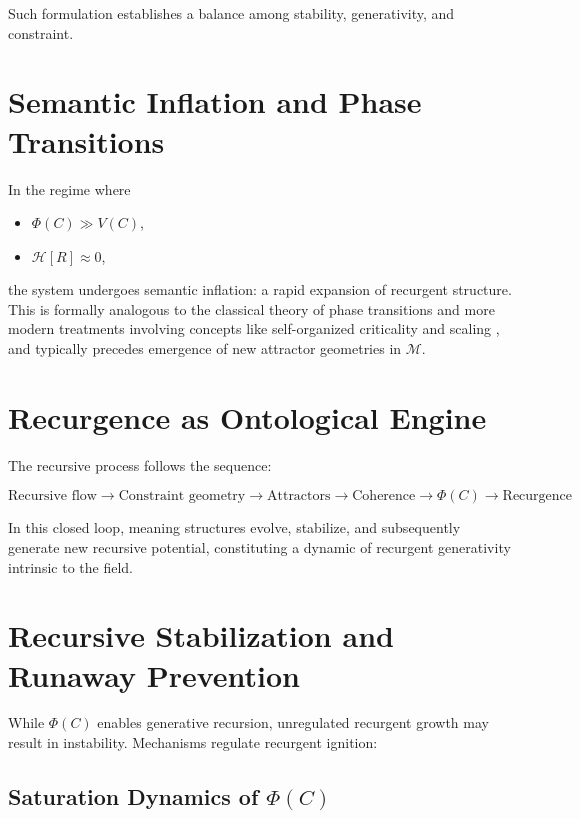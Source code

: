 Such formulation establishes a balance among stability, generativity, and constraint.

\section{Semantic Inflation and Phase Transitions}

In the regime where

\begin{itemize}
    \item \(\Phi(C) \gg V(C)\),
    \item \(\mathcal{H}[R] \approx 0\),
\end{itemize}

the system undergoes semantic inflation: a rapid expansion of recurgent structure. This is formally analogous to the classical theory of phase transitions \autocite{Landau1937} and more modern treatments involving concepts like self-organized criticality and scaling \autocite{BakTangWiesenfeld1987, Cardy1996, Goldenfeld1992}, and typically precedes emergence of new attractor geometries in \(\mathcal{M}\).

\section{Recurgence as Ontological Engine}

The recursive process follows the sequence:

\begin{equation}
\text{Recursive flow} \rightarrow \text{Constraint geometry} \rightarrow \text{Attractors} \rightarrow \text{Coherence} \rightarrow \Phi(C) \rightarrow \text{Recurgence}
\end{equation}

In this closed loop, meaning structures evolve, stabilize, and subsequently generate new recursive potential, constituting a dynamic of recurgent generativity intrinsic to the field.

\section{Recursive Stabilization and Runaway Prevention}

While \(\Phi(C)\) enables generative recursion, unregulated recurgent growth may result in instability. Mechanisms regulate recurgent ignition:

\subsection[Saturation Dynamics of Phi(C)]{Saturation Dynamics of \(\Phi(C)\)}

